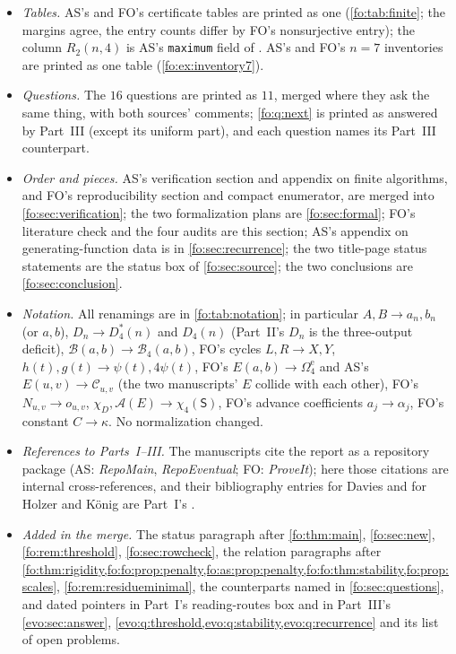 \documentclass[11pt,a4paper]{article}
\numberwithin{equation}{section}
\theoremstyle{definition}
\theoremstyle{remark}
\newcommand{\Bip}{\mathcal B}
\begin{document}
\begin{itemize}
\item \emph{Tables.} AS's and FO's certificate tables are printed as one
 (\cref{fo:tab:finite}; the margins agree, the entry counts differ by FO's
 nonsurjective entry); the column $R_2(n,4)$ is AS's \texttt{maximum} field
 of . AS's and FO's $n=7$
 inventories are printed as one table (\cref{fo:ex:inventory7}).
\item \emph{Questions.} The $16$ questions are printed as $11$, merged where
 they ask the same thing, with both sources' comments;
 \cref{fo:q:next} is printed as answered by Part~III (except its uniform
 part), and each question names its Part~III counterpart.
\item \emph{Order and pieces.} AS's verification section and appendix on
 finite algorithms, and FO's reproducibility section and compact enumerator,
 are merged into \cref{fo:sec:verification}; the two formalization plans are
 \cref{fo:sec:formal}; FO's literature check and the four audits are this
 section; AS's appendix on generating-function data is in
 \cref{fo:sec:recurrence}; the two title-page status statements are the
 status box of \cref{fo:sec:source}; the two conclusions are
 \cref{fo:sec:conclusion}.
\item \emph{Notation.} All renamings are in \cref{fo:tab:notation}; in
 particular $A,B\to a_n,b_n$ (or $a,b$), $D_n\to D^*_4(n)$ and $D_4(n)$ (Part~II's
 $D_n$ is the three-output deficit), $\mathcal B(a,b)\to\Bip_4(a,b)$, FO's cycles $L,R\to
 X,Y$, $h(t),g(t)\to\psi(t),4\psi(t)$, FO's $E(a,b)\to\Omega^{\mathrm e}_4$ and
 AS's $E(u,v)\to\mathcal C_{u,v}$ (the two manuscripts' $E$ collide with each
 other), FO's $N_{u,v}\to o_{u,v}$, $\chi_D,\mathcal A(E)\to\chi_4(\mathsf S)$,
 FO's advance coefficients $a_j\to\alpha_j$, FO's constant $C\to\kappa$. No
 normalization changed.
\item \emph{References to Parts~I--III.} The manuscripts cite the report as a
 repository package (AS: \emph{RepoMain}, \emph{RepoEventual}; FO:
 \emph{ProveIt}); here those citations are internal cross-references, and
 their bibliography entries for Davies and for Holzer and K\"onig are Part~I's
 \cite{Davies2017,HolzerKoenig2004}.
\item \emph{Added in the merge.} The status paragraph after
 \cref{fo:thm:main}, \cref{fo:sec:new}, \cref{fo:rem:threshold},
 \cref{fo:sec:rowcheck}, the relation paragraphs after
 \cref{fo:thm:rigidity,fo:fo:prop:penalty,fo:as:prop:penalty,fo:fo:thm:stability,fo:prop:scales},
 \cref{fo:rem:residueminimal}, the counterparts named in
 \cref{fo:sec:questions}, and dated pointers in Part~I's reading-routes box
 and in Part~III's \cref{evo:sec:answer}, \cref{evo:q:threshold,evo:q:stability,evo:q:recurrence}
 and its list of open problems.
\end{itemize}
\endgroup
\end{document}

